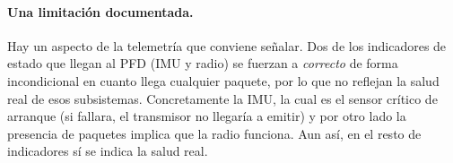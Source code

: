 \paragraph{Una limitación documentada.}
Hay un aspecto de la telemetría que conviene señalar. Dos de los indicadores de estado que
llegan al PFD (IMU y radio) se fuerzan a \textit{correcto} de forma incondicional
en cuanto llega cualquier paquete, por lo que no reflejan la salud real de esos
subsistemas. Concretamente la IMU, la cual es el sensor
crítico de arranque (si fallara, el transmisor no llegaría a emitir) y por otro lado la
presencia de paquetes implica que la radio funciona. Aun así, en el resto de indicadores sí se indica la salud real.
